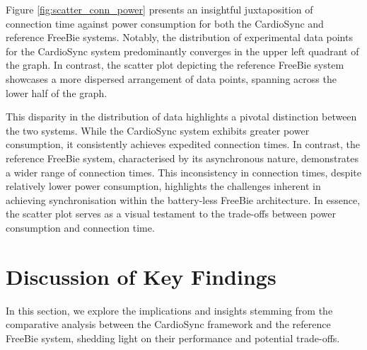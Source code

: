 \noindent Figure \ref{fig:scatter_conn_power} presents an insightful juxtaposition of connection time against power consumption for both the CardioSync and reference FreeBie systems. Notably, the distribution of experimental data points for the CardioSync system predominantly converges in the upper left quadrant of the graph. In contrast, the scatter plot depicting the reference FreeBie system showcases a more dispersed arrangement of data points, spanning across the lower half of the graph.
\vspace{1\baselineskip}

\noindent This disparity in the distribution of data highlights a pivotal distinction between the two systems. While the CardioSync system exhibits greater power consumption, it consistently achieves expedited connection times. In contrast, the reference FreeBie system, characterised by its asynchronous nature, demonstrates a wider range of connection times. This inconsistency in connection times, despite relatively lower power consumption, highlights the challenges inherent in achieving synchronisation within the battery-less FreeBie architecture. In essence, the scatter plot serves as a visual testament to the trade-offs between power consumption and connection time.


\section{Discussion of Key Findings}
In this section, we explore the implications and insights stemming from the comparative analysis between the CardioSync framework and the reference FreeBie system, shedding light on their performance and potential trade-offs.

